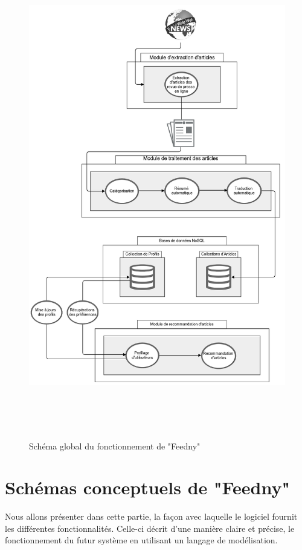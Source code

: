 \begin{figure}[H]
    \centering
    \includegraphics[height=600pt,width=450pt]{img/chapter3/global.png}
    \caption{Schéma global du fonctionnement de "Feedny"}
    \label{shemaglobal}
\end{figure}


\section{Schémas conceptuels de "Feedny"}
Nous allons présenter dans cette partie, la façon avec laquelle le logiciel fournit les différentes fonctionnalités. Celle-ci décrit d'une manière claire et précise, le fonctionnement du futur système en utilisant un langage de modélisation. 

